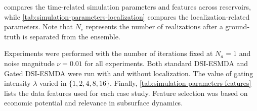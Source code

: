  compares the time-related simulation parameters and features across reservoirs, 
while \cref{tab:simulation-parameters-localization} compares the localization-related parameters.
%
Note that $N_e$ represents the number of realizations after a ground-truth is separated from the ensemble.

Experiments were performed
with the number of iterations fixed at $N_a = 1$ and noise magnitude $\nu=0.01$ for all experiments.
%
Both standard DSI-ESMDA and Gated DSI-ESMDA were run with and without localization.
The value of gating intensity $\lambda$ varied in $\{1, 2, 4, 8, 16\}$. 
Finally, \cref{tab:simulation-parameters-features} lists the data features used for each case study.
Feature selection was based on economic potential and relevance in subsurface dynamics.

\begin{table}[h!]
\end{table}

\begin{table}[h!]
\end{table}

\begin{table}[h!]
\end{table}
